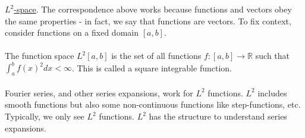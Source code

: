 \documentclass[12pt, letterpaper]{article}
\begin{document}
\underline{$L^2$-space}. The correspondence above works because functions and vectors obey the 
same properties - in fact, we say that functions are vectors. To fix context, consider functions
on a fixed domain $[a,b]$.  \\ \\
The function space $L^2[a,b]$ is the set of all functions $f:[a,b] \rightarrow \mathbb{R}$ 
such that $\int_{a}^{b}f(x)^2 dx < \infty$. This is called a square integrable function. \\ \\
Fourier series, and other series expansions, work for $L^2$ functions. $L^2$ includes smooth 
functions but also some non-continuous functions like step-functions, etc. Typically, we only 
see $L^2$ functions. $L^2$ has the structure to understand series expansions.
\end{document}
